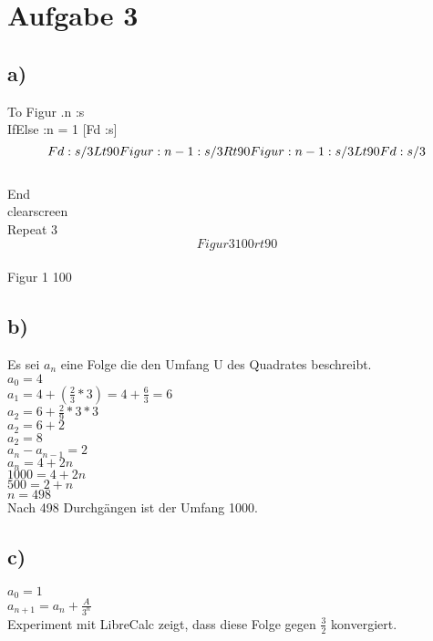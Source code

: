 \documentclass{article}
\begin{document}
	\section*{Aufgabe 3}
	\subsection*{a)}
	To Figur .n :s \\
	IfElse :n = 1 [Fd :s] \\
	\[ \\ 
	Fd :s/3 \\
	Lt 90 \\
	Figur :n-1 :s/3 \\ 
	Rt 90 \\
	Figur :n-1 :s/3 \\
	Lt 90 \\ 
	Fd :s/3 \\
	\] \\
	End \\
	clearscreen \\
	Repeat 3 \[Figur 3 100 rt 90 \] \\
	Figur 1 100
	
	\subsection*{b)}
	Es sei $a_{n}$ eine Folge die den Umfang U des Quadrates beschreibt. \\ 
	$a_{0}  = 4$ \\
	$a_{1} = 4 + (\frac{2}{3}*3) = 4 + \frac{6}{3} = 6$ \\
	$a_{2} = 6 + \frac{2}{9}*3*3$ \\
	$a_{2} = 6 + 2$ \\
	$a_{2} = 8$ \\
	$a_{n} - a_{n-1} = 2$ \\
	$a_{n} = 4 + 2n$ \\
	$1000 = 4 + 2n$ \\
	$500 = 2 + n$ \\
	$n = 498$ \\
	Nach 498 Durchgängen ist der Umfang 1000.
	\subsection*{c)}
	$a_{0} = 1$ \\
	$a_{n+1} = a_{n} + \frac{A}{3^n}$ \\
	Experiment mit LibreCalc zeigt, dass diese Folge gegen $\frac{3}{2}$ konvergiert.
\end{document}
